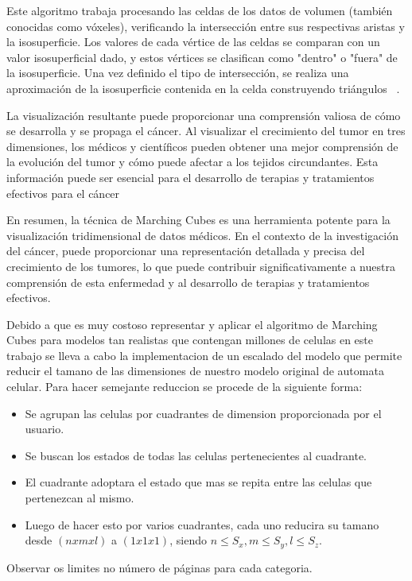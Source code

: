 \documentclass[a4paper,11pt]{article}
\begin{document}
{Este algoritmo trabaja procesando las celdas de los datos de volumen (también conocidas como vóxeles), verificando la intersección entre sus respectivas aristas y la isosuperficie. Los valores de cada vértice de las celdas se comparan con un valor isosuperficial dado, y estos vértices se clasifican como "dentro" o "fuera" de la isosuperficie. Una vez definido el tipo de intersección, se realiza una aproximación de la isosuperficie contenida en la celda construyendo triángulos ~\cite{6}.

La visualización resultante puede proporcionar una comprensión valiosa de cómo se desarrolla y se propaga el cáncer. Al visualizar el crecimiento del tumor en tres dimensiones, los médicos y científicos pueden obtener una mejor comprensión de la evolución del tumor y cómo puede afectar a los tejidos circundantes. Esta información puede ser esencial para el desarrollo de terapias y tratamientos efectivos para el cáncer 

En resumen, la técnica de Marching Cubes es una herramienta potente para la visualización tridimensional de datos médicos. En el contexto de la investigación del cáncer, puede proporcionar una representación detallada y precisa del crecimiento de los tumores, lo que puede contribuir significativamente a nuestra comprensión de esta enfermedad y al desarrollo de terapias y tratamientos efectivos.

Debido a que es muy costoso representar y aplicar el algoritmo de Marching Cubes para modelos tan realistas que contengan millones de celulas en este trabajo se lleva a cabo la implementacion de un escalado del modelo que permite reducir el tamano de las dimensiones de nuestro modelo original de automata celular. Para hacer semejante reduccion se procede de la siguiente forma:
\begin{itemize}
    \item Se agrupan las celulas por cuadrantes de dimension proporcionada por el usuario.
    \item Se buscan los estados de todas las celulas pertenecientes al cuadrante.
    \item El cuadrante adoptara el estado que mas se repita entre las celulas que pertenezcan al mismo.
    \item Luego de hacer esto por varios cuadrantes, cada uno reducira su tamano desde $(n x m x l)$ a $(1 x 1 x 1)$, siendo $n \leq S_{x} ,m \leq S_{y},l \leq S_{z}$. 
\end{itemize}

Observar os limites no número de páginas para cada categoria.

}
\end{document}
